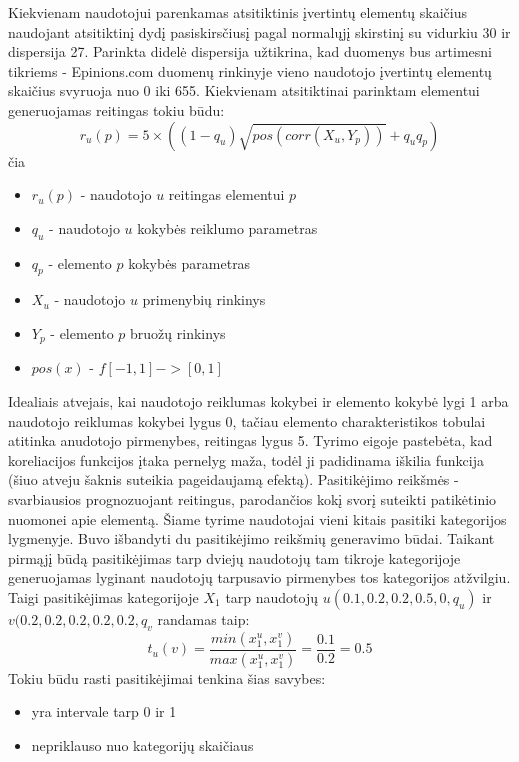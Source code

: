 \documentclass{VUMIFInfMagistrinis}
\begin{document}
\newline
\indent
Kiekvienam naudotojui parenkamas atsitiktinis įvertintų elementų skaičius naudojant atsitiktinį dydį pasiskirsčiusį pagal normalųjį skirstinį su vidurkiu 30 ir dispersija 27. Parinkta didelė dispersija užtikrina, kad duomenys bus artimesni tikriems - Epinions.com duomenų rinkinyje vieno naudotojo įvertintų elementų skaičius svyruoja nuo 0 iki 655. Kiekvienam atsitiktinai parinktam elementui generuojamas reitingas tokiu būdu:
\begin{equation}
	r_u(p) = 5 \times ((1-q_u) \sqrt{pos(corr(X_u,Y_p))} + q_u q_p)
\end{equation}
čia
\begin{itemize}
	\item $r_u(p)$ - naudotojo $u$ reitingas elementui $p$
	\item $q_u$ - naudotojo $u$ kokybės reiklumo parametras
	\item $q_p$ - elemento $p$ kokybės parametras
	\item $X_u$ - naudotojo $u$ primenybių rinkinys 
	\item $Y_p$ - elemento $p$ bruožų rinkinys
	\item $pos(x)$ - $f[-1,1] -> [0,1]$
\end{itemize}
\indent
Idealiais atvejais, kai naudotojo reiklumas kokybei ir elemento kokybė lygi 1 arba naudotojo reiklumas kokybei lygus 0, tačiau elemento charakteristikos tobulai atitinka anudotojo pirmenybes, reitingas lygus 5. Tyrimo eigoje pastebėta, kad koreliacijos funkcijos įtaka pernelyg maža, todėl ji padidinama iškilia funkcija (šiuo atveju šaknis suteikia pageidaujamą efektą).
\indent
Pasitikėjimo reikšmės - svarbiausios prognozuojant reitingus, parodančios kokį svorį suteikti patikėtinio nuomonei apie elementą. Šiame tyrime naudotojai vieni kitais pasitiki kategorijos lygmenyje. Buvo išbandyti du pasitikėjimo reikšmių generavimo būdai.
\newline
\indent
Taikant pirmąjį būdą pasitikėjimas tarp dviejų naudotojų tam tikroje kategorijoje generuojamas lyginant naudotojų tarpusavio pirmenybes tos kategorijos atžvilgiu. Taigi pasitikėjimas kategorijoje $X_1$ tarp naudotojų $u(0.1, 0.2, 0.2, 0.5, 0, q_u)$ ir $v(0.2, 0.2, 0.2, 0.2, 0.2, q_v$ randamas taip:
\begin{equation}
	t_u(v) = \frac{min(x_1^u, x_1^v)}{max(x_1^u, x_1^v)} = \frac{0.1}{0.2} = 0.5
\end{equation}
Tokiu būdu rasti pasitikėjimai tenkina šias savybes:
\begin{itemize}
	\item yra intervale tarp 0 ir 1
	\item nepriklauso nuo kategorijų skaičiaus
\end{itemize}
\end{document}
